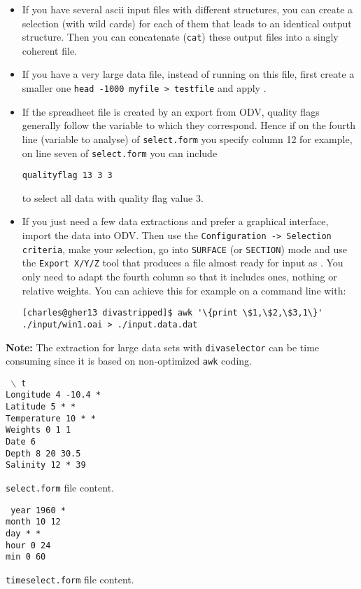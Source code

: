 \begin{itemize}
\item If you have several ascii input files with different structures, you can create a selection (with wild cards) for each of them that leads to an identical output structure. Then you can concatenate ({\tt cat}) these output files into a singly coherent
file.

\item If you have a very large data file, instead of running  on this file, first create a smaller one {\tt head -1000 myfile > testfile} and apply .

\item If the spreadheet file is created by an export from ODV, quality flags generally follow the variable to which they correspond. Hence if on the fourth line (variable to analyse) of {\tt select.form} you specify column 12 for example, on line seven of {\tt select.form} you can include 

{\tt qualityflag  13   3 3}

to select all data with quality flag value 3.

\item If you just need a few data extractions and prefer a graphical interface, import the data into ODV. Then use the
{\tt Configuration -> Selection criteria}, make your selection, go into {\tt SURFACE} (or {\tt SECTION}) mode and use the {\tt Export X/Y/Z} tool that produces a  file almost ready for \diva input as . You only need to adapt the fourth column so that it includes ones, nothing or relative weights. You can achieve this for example on a command line with:
\begin{lstlisting}[style=Bash]
[charles@gher13 divastripped]$ awk '\{print \$1,\$2,\$3,1\}' ./input/win1.oai > ./input.data.dat
\end{lstlisting}
\end{itemize}

{\bf Note:} The extraction for large data sets with {\tt divaselector} can be time consuming since it is based on non-optimized {\tt awk} coding.
 
\begin{exfile}[H]
\begin{footnotesize}
\texttt{
$\backslash$ t\\
Longitude  4  -10.4  *\\
Latitude  5  *  *\\
Temperature  10  *  *\\
Weights   0   1    1\\
Date  6  \\
Depth  8  20  30.5\\
Salinity  12  *  39\\
}
\end{footnotesize}
\caption{{\tt select.form} file content.} 
\end{exfile}


\begin{exfile}[H]
\begin{footnotesize}
\texttt{
year 1960 *\\
month 10 12\\
day * *\\
hour 0 24\\
min 0 60
}
\end{footnotesize}
\caption{{\tt timeselect.form} file content.} 
\end{exfile}


